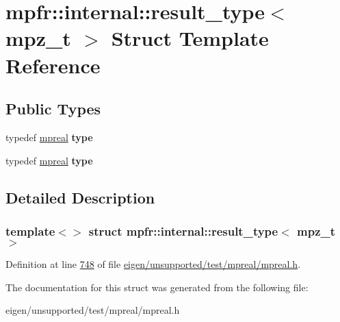 \hypertarget{structmpfr_1_1internal_1_1result__type_3_01mpz__t_01_4}{}\section{mpfr\+:\+:internal\+:\+:result\+\_\+type$<$ mpz\+\_\+t $>$ Struct Template Reference}
\label{structmpfr_1_1internal_1_1result__type_3_01mpz__t_01_4}
\subsection*{Public Types}
\begin{DoxyCompactItemize}
\item 
\mbox{\label{structmpfr_1_1internal_1_1result__type_3_01mpz__t_01_4_a7bef16224a4782f554901bbd052962f4}} 
typedef \hyperlink{classmpfr_1_1mpreal}{mpreal} {\bfseries type}
\item 
\mbox{\label{structmpfr_1_1internal_1_1result__type_3_01mpz__t_01_4_a7bef16224a4782f554901bbd052962f4}} 
typedef \hyperlink{classmpfr_1_1mpreal}{mpreal} {\bfseries type}
\end{DoxyCompactItemize}


\subsection{Detailed Description}
\subsubsection*{template$<$$>$\newline
struct mpfr\+::internal\+::result\+\_\+type$<$ mpz\+\_\+t $>$}



Definition at line \hyperlink{eigen_2unsupported_2test_2mpreal_2mpreal_8h_source_l00748}{748} of file \hyperlink{eigen_2unsupported_2test_2mpreal_2mpreal_8h_source}{eigen/unsupported/test/mpreal/mpreal.\+h}.



The documentation for this struct was generated from the following file\+:\begin{DoxyCompactItemize}
\item 
eigen/unsupported/test/mpreal/mpreal.\+h\end{DoxyCompactItemize}
